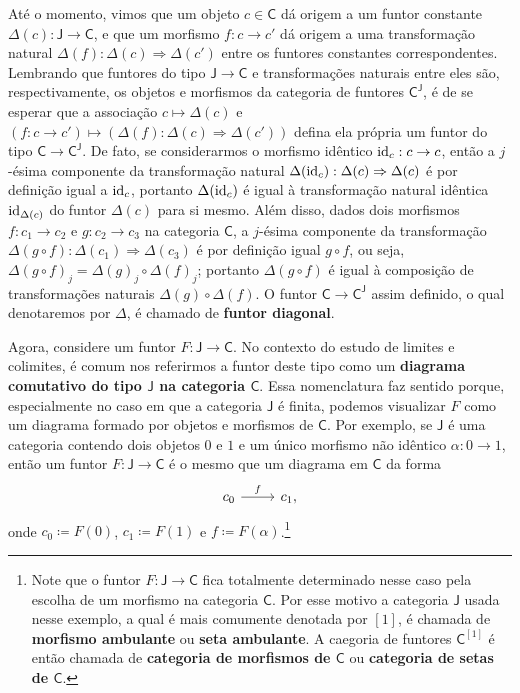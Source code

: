 Até o momento, vimos que um objeto $c \in \mathsf{C}$ dá origem a um funtor constante $\Delta(c): \mathsf{J} \to \mathsf{C}$, e que um morfismo $f: c \to c'$ dá origem a uma transformação natural $\Delta(f): \Delta(c) \Rightarrow \Delta(c')$ entre os funtores constantes correspondentes.
Lembrando que funtores do tipo $\mathsf{J} \to \mathsf{C}$ e transformações naturais entre eles são, respectivamente, os objetos e morfismos da categoria de funtores $\mathsf{C^J}$, é de se esperar que a associação $c \mapsto \Delta(c)$ e $(f: c \to c') \mapsto (\Delta(f): \Delta(c) \Rightarrow \Delta(c'))$ defina ela própria um funtor do tipo $\mathsf{C} \to \mathsf{C^J}$.
De fato, se considerarmos o morfismo idêntico $\mathrm{id}_c: c \to c$, então a $j$-ésima componente da transformação natural $\Delta(\mathrm{id}_c): \Delta(c) \Rightarrow \Delta(c)$ é por definição igual a $\mathrm{id}_c$, portanto $\Delta(\mathrm{id}_c)$ é igual à transformação natural idêntica $\mathrm{id}_{\Delta(c)}$ do funtor $\Delta(c)$ para si mesmo.
Além disso, dados dois morfismos $f: c_1 \to c_2$ e $g: c_2 \to c_3$ na categoria $\mathsf{C}$, a $j$-ésima componente da transformação $\Delta(g \circ f): \Delta(c_1) \Rightarrow \Delta(c_3)$ é por definição igual $g \circ f$, ou seja, $\Delta(g \circ f)_j = \Delta(g)_j \circ \Delta(f)_j$; portanto $\Delta(g \circ f)$ é igual à composição de transformações naturais $\Delta(g) \circ \Delta(f)$.
O funtor $\mathsf{C} \to \mathsf{C^J}$ assim definido, o qual denotaremos por $\Delta$, é chamado de \textbf{funtor diagonal}.

Agora, considere um funtor $F: \mathsf{J} \to \mathsf{C}$.
No contexto do estudo de limites e colimites, é comum nos referirmos a funtor deste tipo como um \textbf{diagrama comutativo do tipo $\mathsf{J}$ na categoria $\mathsf{C}$}.
Essa nomenclatura faz sentido porque, especialmente no caso em que a categoria $\mathsf{J}$ é finita, podemos visualizar $F$ como um diagrama formado por objetos e morfismos de $\mathsf{C}$.
Por exemplo, se $\mathsf{J}$ é uma categoria contendo dois objetos $0$ e $1$ e um único morfismo não idêntico $\alpha: 0 \to 1$, então um funtor $F: \mathsf{J} \to \mathsf{C}$ é o mesmo que um diagrama em $\mathsf{C}$ da forma
\begin{displaymath}
  \begin{tikzcd}
    c_0
    \arrow[r, "f"]
    & c_1,
  \end{tikzcd}
\end{displaymath}
onde $c_0 \coloneqq F(0)$, $c_1 \coloneqq F(1)$ e $f \coloneqq F(\alpha)$.\footnote{Note que o funtor $F: \mathsf{J} \to \mathsf{C}$ fica totalmente determinado nesse caso pela escolha de um morfismo na categoria $\mathsf{C}$. Por esse motivo a categoria $\mathsf{J}$ usada nesse exemplo, a qual é mais comumente denotada por $[1]$, é chamada de \textbf{morfismo ambulante} ou \textbf{seta ambulante}. A caegoria de funtores $\mathsf{C}^{[1]}$ é então chamada de \textbf{categoria de morfismos de $\mathsf{C}$} ou \textbf{categoria de setas de $\mathsf{C}$}.}


\printbibliography


